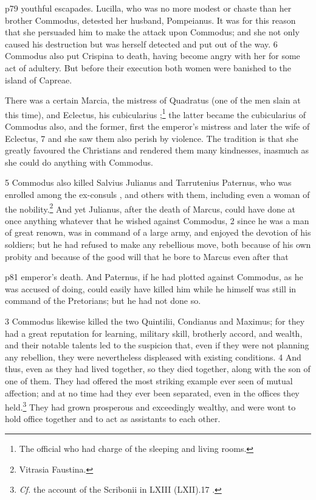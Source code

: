 p79 youthful escapades. Lucilla, who was no more modest or chaste than her brother Commodus, detested her husband, Pompeianus. It was for this reason that she persuaded him to make the attack upon Commodus; and she not only caused his destruction but was herself detected and put out of the way. 6 Commodus also put Crispina to death, having become angry with her for some act of adultery. But before their execution both women were banished to the island of Capreae.

There was a certain Marcia, the mistress of Quadratus (one of the men slain at this time), and Eclectus, his cubicularius ;\texthebrew{⁠}\footnote{The official who had charge of the sleeping and living rooms.

} the latter became the cubicularius of Commodus also, and the former, first the emperor's mistress and later the wife of Eclectus, 7 and she saw them also perish by violence. The tradition is that she greatly favoured the Christians and rendered them many kindnesses, inasmuch as she could do anything with Commodus.

5
Commodus also killed Salvius Julianus and Tarrutenius Paternus, who was enrolled among the ex-consuls , and others with them, including even a woman of the nobility.\texthebrew{⁠}\footnote{Vitrasia Faustina.

} And yet Julianus, after the death of Marcus, could have done at once anything whatever that he wished against Commodus, 2 since he was a man of great renown, was in command of a large army, and enjoyed the devotion of his soldiers; but he had refused to make any rebellious move, both because of his own probity and because of the good will that he bore to Marcus even after that

p81 emperor's death. And Paternus, if he had plotted against Commodus, as he was accused of doing, could easily have killed him while he himself was still in command of the Pretorians; but he had not done so.

3
Commodus likewise killed the two Quintilii, Condianus and Maximus; for they had a great reputation for learning, military skill, brotherly accord, and wealth, and their notable talents led to the suspicion that, even if they were not planning any rebellion, they were nevertheless displeased with existing conditions. 4 And thus, even as they had lived together, so they died together, along with the son of one of them. They had offered the most striking example ever seen of mutual affection; and at no time had they ever been separated, even in the offices they held.\texthebrew{⁠}\footnote{\emph{Cf.} the account of the Scribonii in LXIII (LXII).17 .

} They had grown prosperous and exceedingly wealthy, and were wont to hold office together and to act as assistants to each other.

